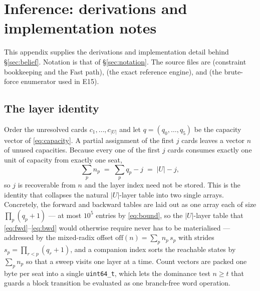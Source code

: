 \section{Inference: derivations and implementation notes}
\label{app:inference}

This appendix supplies the derivations and implementation detail behind
\S\ref{sec:belief}. Notation is that of \S\ref{sec:notation}. The source files
are  (constraint bookkeeping and the Fast path),
 (the exact reference engine), and
 (the brute-force enumerator used in E15).

\subsection{The layer identity}
\label{app:layer}

Order the unresolved cards $c_1,\dots,c_{|U|}$ and let $q = (q_0,\dots,q_5)$ be
the capacity vector of \eqref{eq:capacity}. A partial assignment of the first $j$
cards leaves a vector $n$ of unused capacities. Because every one of the first
$j$ cards consumes exactly one unit of capacity from exactly one seat,
\[
  \sum_p n_p \;=\; \sum_p q_p - j \;=\; |U| - j ,
\]
so $j$ is recoverable from $n$ and the layer index need not be stored. This is
the identity that collapses the natural $|U|$-layer table into two single arrays.
Concretely, the forward and backward tables are laid out as one array each of
size $\prod_p (q_p+1)$ --- at most $10^5$ entries by \eqref{eq:bound}, so the
$|U|$-layer table that \eqref{eq:fwd}--\eqref{eq:bwd} would otherwise require
never has to be materialised --- addressed by the mixed-radix offset
$\mathrm{off}(n) = \sum_p n_p \, s_p$ with strides $s_p = \prod_{r<p}(q_r+1)$,
and a companion index sorts the reachable states by $\sum_p n_p$ so that a sweep
visits one layer at a time. Count vectors are packed one byte per seat into a
single \verb|uint64_t|, which lets the dominance test $n \ge t$ that guards a
block transition be evaluated as one branch-free word operation.

